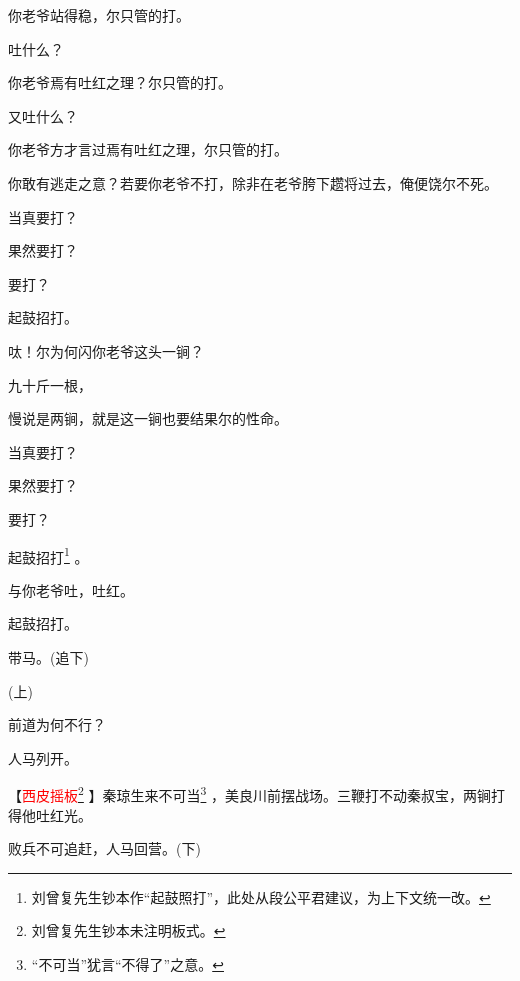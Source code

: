 {你老爷站得稳，尔只管的打。

吐什么？

你老爷焉有吐红之理？尔只管的打。

又吐什么？

你老爷方才言过焉有吐红之理，尔只管的打。

你敢有逃走之意？若要你老爷不打，除非在老爷胯下趱将过去，俺便饶尔不死。

当真要打？

果然要打？

要打？

起鼓招打。

呔！尔为何闪你老爷这头一锏？

九十斤一根，

慢说是两锏，就是这一锏也要结果尔的性命。

当真要打？

果然要打？

要打？

起鼓招打\footnote{刘曾复先生钞本作``起鼓照打''，此处从段公平{\scriptsize 君}建议，为上下文统一改。}
。

与你老爷吐，吐红。

起鼓招打。

带马。({\hwfs 追下})

\vspace{5pt}

({\hwfs 上})

前道为何不行？

人马列开。

【{\akai \textcolor{red}{西皮摇板}\footnote{刘曾复先生钞本未注明板式。}%
}】秦琼生来不可当\footnote{``不可当''犹言``不得了''之意。}
，美良川前摆战场。三鞭打不动秦叔宝，两锏打得他吐红光。

败兵不可追赶，人马回营。({\hwfs 下})}

